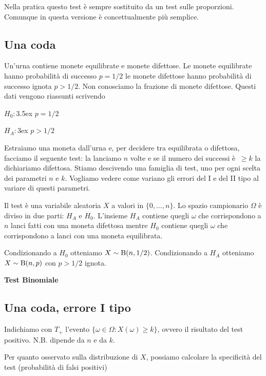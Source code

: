 \documentclass[12pt,openany]{book}
\theoremstyle{mio}
\theoremstyle{liscio}
\begin{document}
Nella pratica questo test è sempre sostituito da un test sulle proporzioni. Comunque in questa versione è concettualmente più semplice. 

\subsection{Una coda}\label{Bernoulli_test}

Un'urna contiene monete equilibrate e monete difettose. Le monete equilibrate hanno probabilità di successo $p=1/2$ le monete difettose hanno probabilità di successo ignota $p>1/2$. Non conosciamo la frazione di monete difettose. Questi dati vengono riassunti scrivendo

$H_0:$\kern3.5ex $p=1/2$

$H_A:$\kern3ex $p>1/2$
 
Estraiamo una moneta dall'urna e, per decidere tra equilibrata o difettosa, facciamo il seguente test: la lanciamo $n$ volte e se il numero dei successi è $\ \ge k$ la dichiariamo difettosa. Stiamo descivendo una famiglia di test, uno per ogni scelta dei parametri $n$ e $k$. Vogliamo vedere come variano gli errori del I e del II tipo al variare di questi parametri. 

Il test è una variabile aleatoria $X$ a valori in $\{0,\dots,n\}$. Lo spazio campionario $\Omega$ è diviso in due parti: $H_A$ e $H_0$.  L'insieme $H_A$ contiene quegli $\omega$ che corrispondono a $n$ lanci fatti con una moneta difettosa mentre $H_0$ contiene quegli $\omega$ che corrispondono a lanci con una moneta equilibrata. 

Condizionando a $H_0$ otteniamo $X\sim {\rm B}(n,1/2)$. Condizionando a $H_A$ otteniamo $X\sim {\rm B}(n,p)$ con $p>1/2$ ignota.


\clearpage\hfill\textbf{Test Binomiale}\subsection{Una coda, errore I tipo}

Indichiamo con $T_+$ l'evento $\{\omega\in\Omega: X(\omega)\ge k\}$, ovvero il risultato del test positivo. N.B. dipende da $n$ e da $k$.

Per quanto osservato sulla distribuzione di $X$, possiamo calcolare la specificità del test (probabilità di falsi positivi)


\end{document}
